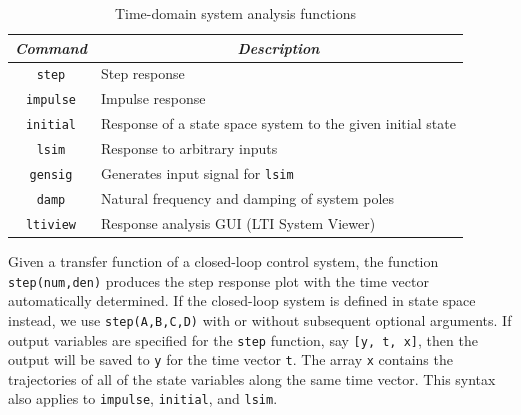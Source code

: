 \begin{table}[bht]
\centering
\renewcommand{\arraystretch}{1.2}
\begin{tabular}{c|p{}}
    \textit{Command}& \multicolumn{1}{c}{\textit{Description}}\\ \hline \hline
    \verb=step=         &   Step response \\
    \verb=impulse=      &   Impulse response \\
    \verb=initial=      &   Response of a state space system to the given
                                initial state \\
    \verb=lsim=         &   Response to arbitrary inputs \\
    \verb=gensig=       &   Generates input signal for \verb=lsim= \\
    \verb=damp=         &   Natural frequency and damping of system poles \\
    \verb=ltiview=      &   Response analysis GUI (LTI System Viewer)
\end{tabular}
\caption{\footnotesize
        Time-domain system analysis functions
        \label{tab.statespace.ConSysToolTime}
        }
\end{table}
\par
Given a transfer function of a closed-loop control system, the function \verb=step(num,den)= produces the step response plot with the time vector automatically determined.  If the closed-loop system is defined in state space instead, we use \verb=step(A,B,C,D)= with or without subsequent optional arguments.  If output variables are specified for the \verb=step= function, say \verb=[y, t, x]=, then the output will be saved to \verb=y= for the time vector \verb=t=.  The array \verb=x= contains the trajectories of all of the state variables along the same time vector.  This syntax also applies to \verb=impulse=, \verb=initial=, and \verb=lsim=.

